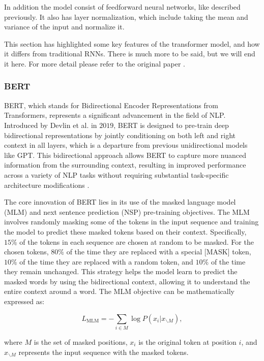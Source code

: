 In addition the model consist of feedforward neural networks, like described previously. It also has layer normalization,
which include taking the mean and variance of the input and normalize it.

This section has highlighted some key features of the transformer model, and how it differs from traditional RNNs.
There is much more to be said, but we will end it here. For more detail please refer to the original paper \cite{vaswani2023attention}.

\subsubsection{BERT}

BERT, which stands for Bidirectional Encoder Representations from Transformers,
represents a significant advancement in the field of NLP. 
Introduced by Devlin et al. in $2019$, BERT is designed to pre-train 
deep bidirectional representations by jointly conditioning on both left and right context
in all layers, which is a departure from previous unidirectional models like GPT.
This bidirectional approach allows BERT to capture more nuanced information from the surrounding context,
resulting in improved performance across a variety of NLP tasks without requiring substantial
task-specific architecture modifications \cite{devlin2019bert}.

The core innovation of BERT lies in its use of the masked language model (MLM)
and next sentence prediction (NSP) pre-training objectives.
The MLM involves randomly masking some of the tokens in the input sequence 
and training the model to predict these masked tokens based on their context. 
Specifically, $15\%$ of the tokens in each sequence are chosen at random to be masked. 
For the chosen tokens, $80\%$ of the time they are replaced with a special [MASK] token, 
$10\%$ of the time they are replaced with a random token, and $10\%$ of the time they remain unchanged. 
This strategy helps the model learn to predict the masked words by using the bidirectional context, 
allowing it to understand the entire context around a word. The MLM objective can be mathematically expressed as:

\begin{equation}
    \label{eq:mlm}
    L_{\text{MLM}} = - \sum_{i \in M} \log P(x_i | x_{\backslash M}),
\end{equation}

where $M$ is the set of masked positions, $x_i$ is the original token at position $i$, and $x_{\backslash M}$ represents the input sequence with the masked tokens.


